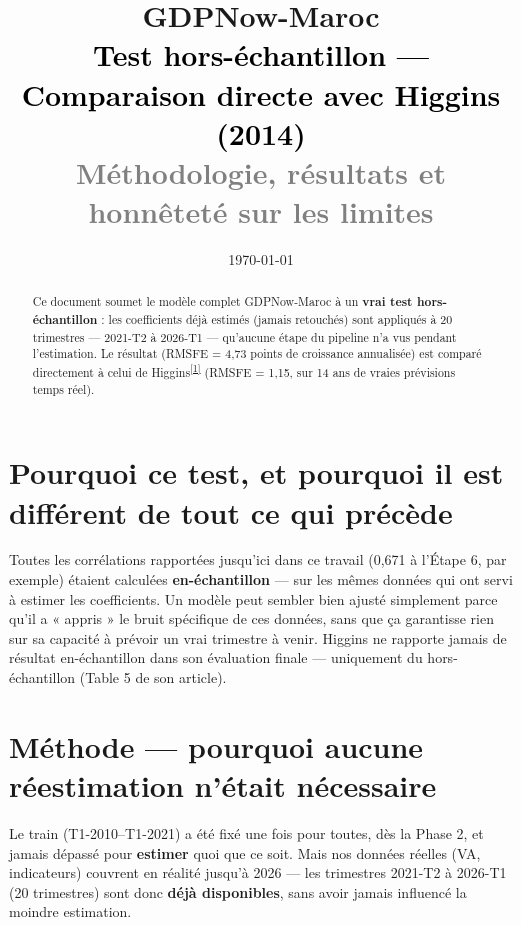 \documentclass[11pt,a4paper]{article}
\title{\vspace{-1.3cm}\textcolor{bleuprincip}{\Huge\bfseries GDPNow-Maroc}\\[0.3cm]
\textcolor{black}{\Large Test hors-échantillon --- Comparaison directe avec Higgins (2014)}\\[0.15cm]
\textcolor{gray}{\large Méthodologie, résultats et honnêteté sur les limites}}
\author{}
\date{\today}
\newcommand{\cit}[1]{\textsuperscript{\hyperlink{ref#1}{[#1]}}}
\begin{document}
\maketitle
\thispagestyle{empty}

\begin{abstract}
\noindent Ce document soumet le modèle complet GDPNow-Maroc à un \textbf{vrai test hors-échantillon} : les coefficients déjà estimés (jamais retouchés) sont appliqués à 20 trimestres --- 2021-T2 à 2026-T1 --- qu'aucune étape du pipeline n'a vus pendant l'estimation. Le résultat (RMSFE = 4,73 points de croissance annualisée) est comparé directement à celui de Higgins\cit{1} (RMSFE = 1,15, sur 14 ans de vraies prévisions temps réel).
\end{abstract}

\tableofcontents
\vspace{0.5cm}

\section{Pourquoi ce test, et pourquoi il est différent de tout ce qui précède}

\begin{intuition}
Toutes les corrélations rapportées jusqu'ici dans ce travail (0,671 à l'Étape 6, par exemple) étaient calculées \textbf{en-échantillon} --- sur les mêmes données qui ont servi à estimer les coefficients. Un modèle peut sembler bien ajusté simplement parce qu'il a « appris » le bruit spécifique de ces données, sans que ça garantisse rien sur sa capacité à prévoir un vrai trimestre à venir. Higgins ne rapporte jamais de résultat en-échantillon dans son évaluation finale --- uniquement du hors-échantillon (Table 5 de son article).
\end{intuition}

\section{Méthode --- pourquoi aucune réestimation n'était nécessaire}

\begin{definitionbox}
Le train (T1-2010--T1-2021) a été fixé une fois pour toutes, dès la Phase 2, et jamais dépassé pour \textbf{estimer} quoi que ce soit. Mais nos données réelles (VA, indicateurs) couvrent en réalité jusqu'à 2026 --- les trimestres 2021-T2 à 2026-T1 (20 trimestres) sont donc \textbf{déjà disponibles}, sans avoir jamais influencé la moindre estimation.
\end{definitionbox}
\end{document}
